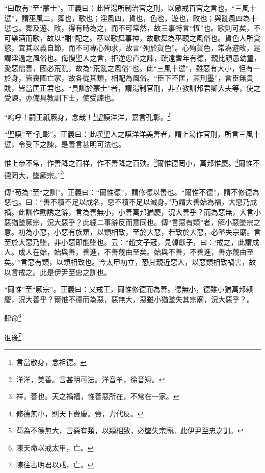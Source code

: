 {\noindent\shu{}\fzkt “曰敢有”至“蒙士”。正義曰：此皆湯所制治官之刑，以儆戒百官之言也。“三風十愆”，謂巫風二，舞也，歌也；淫風四，貨也，色也，遊也，畋也；與亂風四為十愆也。舞及遊、畋，得有時為之，而不可常然，故三事特言“恆”也。歌則可矣，不可樂酒而歌，故以“酣”配之。巫以歌舞事神，故歌舞為巫覡之風俗也。貨色人所貪慾，宜其以義自節，而不可專心殉求，故言“殉於貨色”。心殉貨色，常為遊畋，是謂淫過之風俗也。侮慢聖人之言，拒逆忠直之諫，疏遠耆年有德，親比頑愚幼童，愛惡憎善，國必荒亂，故為“荒亂之風俗”也。此“三風十愆”，雖惡有大小，但有一於身，皆喪國亡家，故各從其類，相配為風俗。“臣下不匡，其刑墨”，言臣無貴賤，皆當匡正君也。“具訓於蒙士”者，謂湯制官刑，非直教訓邦君卿大夫等，使之受諫，亦備具教訓下士，使受諫也。 \par}

“嗚呼！嗣王祇厥身，念哉！\footnote{言當敬身，念祖德。}聖謨洋洋，嘉言孔彰。\footnote{洋洋，美善。言甚明可法。洋音羊，徐音翔。}

{\noindent\shu{}\fzkt “聖謨”至“孔彰”。正義曰：此嘆聖人之謨洋洋美善者，謂上湯作官刑，所言三風十愆，令受下之諫，是善言甚明可法也。 \par}

惟上帝不常，作善降之百祥，作不善降之百殃。\footnote{祥，善也。天之禍福，惟善惡所在，不常在一家。}爾惟德罔小，萬邦惟慶。\footnote{修德無小，則天下賚慶。賚，力代反。}爾惟不德罔大，墜厥宗。”\footnote{苟為不德無大，言惡有類，以類相致，必墜失宗廟。此伊尹至忠之訓。}


{\noindent\zhuan{}\fzbyks 傳“苟為”至“之訓”。正義曰：“爾惟德”，謂修德以善也。“爾惟不德”，謂不修德為惡也。曰：“善不積不足以成名，惡不積不足以滅身。”乃謂大善始為福，大惡乃成禍。此訓作勸誘之辭，言為善無小，小善萬邦猶慶，況大善乎？而為惡無，大言小惡猶墜厥宗，況大惡乎？此經二事辭反而意同也。傳“言惡有類”者，解小惡墜宗之意。初為小惡，小惡有族類，以類相致，至於大惡，若致於大惡，必墜失宗廟。言至於大惡乃墜，非小惡即能墜也。云：“趙文子冠，見韓獻子，曰：‘戒之，此謂成人。成人在始，始與善，善進，不善蔑由至矣。始與不善，不善進，善亦蔑由至矣。’”言惡有類，以類相致也。今太甲初立，恐其親近惡人，以惡類相致禍害，故以言戒之。此是伊尹至忠之訓也。 \par}

{\noindent\shu{}\fzkt “爾惟”至“厥宗”。正義曰：又戒王，爾惟修德而為善。德無小，德雖小猶萬邦賴慶，況大善乎？爾惟不德而為惡，惡無大，惡雖小猶墜失其宗廟，況大惡乎？。 \par}

肆命\footnote{陳天命以戒太甲，亡。}

徂後\footnote{陳往古明君以戒，亡。}

